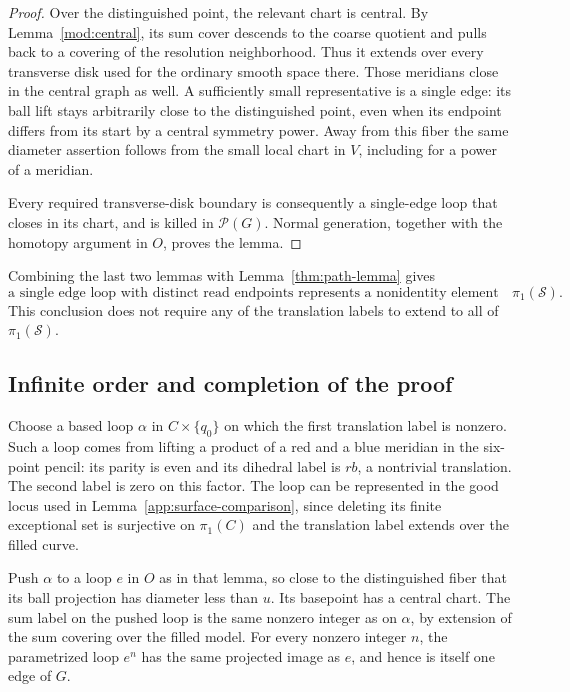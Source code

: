 \documentclass[11pt,reqno]{amsart}
\numberwithin{equation}{section}
\theoremstyle{definition}
\theoremstyle{remark}
\newcommand{\cS}{\mathcal S}
\begin{document}
\begin{proof}
Over the distinguished point, the relevant chart is central.  By
Lemma~\ref{mod:central}, its sum cover descends to the coarse quotient
and pulls back to a covering of the resolution neighborhood.  Thus
it extends over every transverse disk used for the ordinary smooth
space there.  Those meridians close in the central graph as well.
A sufficiently small representative is a single edge: its ball lift
stays arbitrarily close to the distinguished point, even when its
endpoint differs from its start by a central symmetry power.
Away from this fiber the same diameter assertion follows from the
small local chart in $V$, including for a power of a meridian.

Every required transverse-disk boundary is consequently a
single-edge loop that closes in its chart, and is killed in
$\mathcal P(G)$.  Normal generation, together with the homotopy
argument in $O$, proves the lemma.
\end{proof}

Combining the last two lemmas with Lemma~\ref{thm:path-lemma} gives
\begin{equation}\label{app:detection}
 \text{a single edge loop with distinct read endpoints represents a
 nonidentity element of }\pi_1(\cS).
\end{equation}
This conclusion does not require any of the translation labels to
extend to all of $\pi_1(\cS)$.

\subsection{Infinite order and completion of the proof}

Choose a based loop $\alpha$ in $C\times\{q_0\}$ on which the first
translation label is nonzero.  Such a loop comes from lifting a
product of a red and a blue meridian in the six-point pencil: its
parity is even and its dihedral label is $rb$, a nontrivial
translation.  The second label is zero on this factor.  The loop
can be represented in the good locus used in
Lemma~\ref{app:surface-comparison}, since deleting its finite
exceptional set is surjective on $\pi_1(C)$ and the translation label
extends over the filled curve.

Push $\alpha$ to a loop $e$ in $O$ as in that lemma, so close to the
distinguished fiber that its ball projection has diameter less than
$u$.  Its basepoint has a central chart.  The sum label on the pushed
loop is the same nonzero integer as on $\alpha$, by extension of the
sum covering over the filled model.  For every nonzero integer $n$,
the parametrized loop $e^n$ has the same projected image as $e$, and
hence is itself one edge of $G$.
\end{document}
